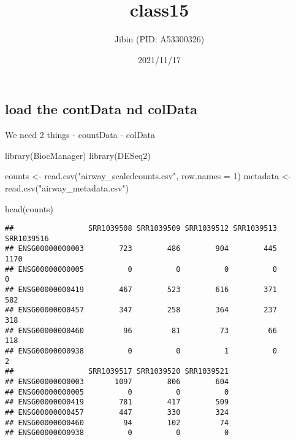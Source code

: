 \documentclass[
]{article}
\title{class15}
\author{Jibin (PID: A53300326)}
\date{2021/11/17}
\newenvironment{Shaded}{\begin{snugshade}}{\end{snugshade}}
\newcommand{\AttributeTok}[1]{\textcolor[rgb]{0.77,0.63,0.00}{#1}}
\newcommand{\DecValTok}[1]{\textcolor[rgb]{0.00,0.00,0.81}{#1}}
\newcommand{\FunctionTok}[1]{\textcolor[rgb]{0.00,0.00,0.00}{#1}}
\newcommand{\NormalTok}[1]{#1}
\newcommand{\OtherTok}[1]{\textcolor[rgb]{0.56,0.35,0.01}{#1}}
\newcommand{\StringTok}[1]{\textcolor[rgb]{0.31,0.60,0.02}{#1}}
\begin{document}
\maketitle

\hypertarget{load-the-contdata-nd-coldata}{%
\subsection{load the contData nd
colData}\label{load-the-contdata-nd-coldata}}

We need 2 things - countData - colData

\begin{Shaded}
\begin{Highlighting}[]
\FunctionTok{library}\NormalTok{(BiocManager)}
\FunctionTok{library}\NormalTok{(DESeq2)}
\end{Highlighting}
\end{Shaded}

\begin{Shaded}
\begin{Highlighting}[]
\NormalTok{counts }\OtherTok{\textless{}{-}} \FunctionTok{read.csv}\NormalTok{(}\StringTok{"airway\_scaledcounts.csv"}\NormalTok{, }\AttributeTok{row.names =} \DecValTok{1}\NormalTok{)}
\NormalTok{metadata }\OtherTok{\textless{}{-}} \FunctionTok{read.csv}\NormalTok{(}\StringTok{"airway\_metadata.csv"}\NormalTok{)}
\end{Highlighting}
\end{Shaded}

\begin{Shaded}
\begin{Highlighting}[]
\FunctionTok{head}\NormalTok{(counts)}
\end{Highlighting}
\end{Shaded}

\begin{verbatim}
##                 SRR1039508 SRR1039509 SRR1039512 SRR1039513 SRR1039516
## ENSG00000000003        723        486        904        445       1170
## ENSG00000000005          0          0          0          0          0
## ENSG00000000419        467        523        616        371        582
## ENSG00000000457        347        258        364        237        318
## ENSG00000000460         96         81         73         66        118
## ENSG00000000938          0          0          1          0          2
##                 SRR1039517 SRR1039520 SRR1039521
## ENSG00000000003       1097        806        604
## ENSG00000000005          0          0          0
## ENSG00000000419        781        417        509
## ENSG00000000457        447        330        324
## ENSG00000000460         94        102         74
## ENSG00000000938          0          0          0
\end{verbatim}
\end{document}
